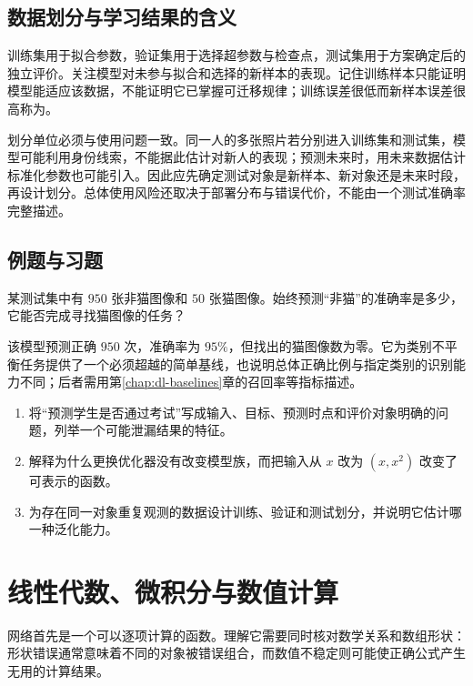 \documentclass[UTF8,12pt,a4paper,fontset=fandol]{ctexbook}
\begin{document}
\section{数据划分与学习结果的含义}
训练集用于拟合参数，验证集用于选择超参数与检查点，测试集用于方案确定后的独立评价。关注模型对未参与拟合和选择的新样本的表现。记住训练样本只能证明模型能适应该数据，不能证明它已掌握可迁移规律；训练误差很低而新样本误差很高称为。

划分单位必须与使用问题一致。同一人的多张照片若分别进入训练集和测试集，模型可能利用身份线索，不能据此估计对新人的表现；预测未来时，用未来数据估计标准化参数也可能引入。因此应先确定测试对象是新样本、新对象还是未来时段，再设计划分。总体使用风险还取决于部署分布与错误代价，不能由一个测试准确率完整描述。

\section{例题与习题}
\begin{example}[高准确率的简单基线]
某测试集中有 $950$ 张非猫图像和 $50$ 张猫图像。始终预测“非猫”的准确率是多少，它能否完成寻找猫图像的任务？
\end{example}
\begin{solve}
该模型预测正确 $950$ 次，准确率为 $95\%$，但找出的猫图像数为零。它为类别不平衡任务提供了一个必须超越的简单基线，也说明总体正确比例与指定类别的识别能力不同；后者需用第\ref{chap:dl-baselines}章的召回率等指标描述。
\end{solve}
\begin{enumerate}
\item 将“预测学生是否通过考试”写成输入、目标、预测时点和评价对象明确的问题，列举一个可能泄漏结果的特征。
\item 解释为什么更换优化器没有改变模型族，而把输入从 $x$ 改为 $(x,x^2)$ 改变了可表示的函数。
\item 为存在同一对象重复观测的数据设计训练、验证和测试划分，并说明它估计哪一种泛化能力。
\end{enumerate}

\chapter{线性代数、微积分与数值计算}
\label{chap:dl-mathematics}
网络首先是一个可以逐项计算的函数。理解它需要同时核对数学关系和数组形状：形状错误通常意味着不同的对象被错误组合，而数值不稳定则可能使正确公式产生无用的计算结果。
\end{document}
